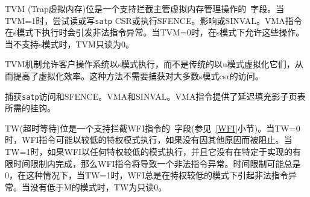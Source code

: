 \iffalse
The TVM (Trap Virtual Memory) bit is a \warl\ field that supports intercepting
supervisor virtual-memory management operations.  When TVM=1,
attempts to read or write the {\tt satp} CSR or execute an SFENCE.VMA or
SINVAL.VMA instruction while executing in S-mode will raise an illegal instruction
exception.  When TVM=0, these operations are permitted in S-mode.
TVM is read-only 0 when S-mode is not supported.
\fi

TVM (Trap虚拟内存)位是一个支持拦截主管虚拟内存管理操作的\warl\ 字段。当TVM=1时，尝试读或写{\tt satp} CSR或执行SFENCE。影响或SINVAL。VMA指令在s模式下执行时会引发非法指令异常。当TVM=0时，在s模式下允许这些操作。当不支持s模式时，TVM只读为0。

\iffalse
\begin{commentary}
The TVM mechanism improves virtualization efficiency by permitting guest
operating systems to execute in S-mode, rather than classically virtualizing
them in U-mode.  This approach obviates the need to trap accesses to most
S-mode CSRs.

Trapping {\tt satp} accesses and the SFENCE.VMA and SINVAL.VMA instructions
provides the hooks necessary to lazily populate shadow page tables.
\end{commentary}
\fi

\begin{commentary}
TVM机制允许客户操作系统以s模式执行，而不是传统的以u模式虚拟化它们，从而提高了虚拟化效率。这种方法不需要捕获对大多数s模式csr的访问。

捕获{\tt satp}访问和SFENCE。VMA和SINVAL。VMA指令提供了延迟填充影子页表所需的挂钩。
\end{commentary}

\iffalse
The TW (Timeout Wait) bit is a \warl\ field that supports intercepting the WFI
instruction (see Section~\ref{wfi}).
When TW=0, the WFI instruction may execute in lower
privilege modes when not prevented for some other reason.  When TW=1,
then if WFI is executed in any less-privileged mode, and it does not complete
within an implementation-specific, bounded time limit, the WFI instruction
causes an illegal instruction exception.  The time limit may always be 0, in which
case WFI always causes an illegal instruction exception in less-privileged modes
when TW=1.  TW is read-only 0 when there are no modes less privileged than
M.
\fi

TW(超时等待)位是一个支持拦截WFI指令的\warl\ 字段(参见~\ref{WFI}小节)。当TW=0时，WFI指令可能以较低的特权模式执行，如果没有因其他原因而被阻止。当TW=1时，如果WFI以任何特权较低的模式执行，并且它没有在特定于实现的有限时间限制内完成，那么WFI指令将导致一个非法指令异常。时间限制可能总是0，在这种情况下，当TW=1时，WFI总是在特权较低的模式下引起非法指令异常。当没有低于M的模式时，TW为只读0。

